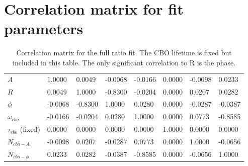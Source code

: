 \section{Correlation matrix for fit parameters}

\begin{table}[H]
\setlength\tabcolsep{0pt}
\begin{tabular*}{\linewidth}{@{\extracolsep{\fill}}lLBLLLLL{c}}
  \toprule
            &  &  & \thead{$\phi$} &  &  &  &  \\
  \midrule
	$A$    			 	 &  1.0000  &  0.0049  & -0.0068  & -0.0166  &  0.0000  & -0.0098  &  0.0233  \\
	$R$     			 &  0.0049  &  1.0000  & -0.8300  & -0.0204  &  0.0000  &  0.0207  &  0.0282  \\
	$\phi$   			 & -0.0068  & -0.8300  &  1.0000  &  0.0280  &  0.0000  & -0.0287  & -0.0387  \\
	$\omega_{cbo}$   	 & -0.0166  & -0.0204  &  0.0280  &  1.0000  &  0.0000  &  0.0773  & -0.8585  \\
	$\tau_{cbo}$ (fixed) &  0.0000  &  0.0000  &  0.0000  &  0.0000  &  1.0000  &  0.0000  &  0.0000  \\
	$N_{cbo-A}$   	 	 & -0.0098  &  0.0207  & -0.0287  &  0.0773  &  0.0000  &  1.0000  & -0.0656  \\
	$N_{cbo-\phi}$   	 &  0.0233  &  0.0282  & -0.0387  & -0.8585  &  0.0000  & -0.0656  &  1.0000  \\
  \bottomrule
\end{tabular*}
\caption{Correlation matrix for the full ratio fit. The CBO lifetime is fixed but included in this table. The only significant correlation to R is the \gmtwo phase.}
\end{table}



